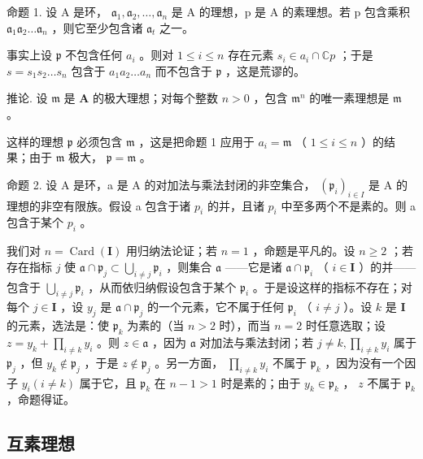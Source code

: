 命题 1. 设 A 是环， \(\mathfrak{a}_1, \mathfrak{a}_2, \ldots, \mathfrak{a}_n\) 是 A 的理想，p 是 A 的素理想。若 p 包含乘积 \(\mathfrak{a}_1\mathfrak{a}_2 \ldots \mathfrak{a}_n\) ，则它至少包含诸 \(\mathfrak{a}_t\) 之一。

事实上设 \(\mathfrak{p}\) 不包含任何 \(a_{i}\) 。则对 \(1 \leqslant i \leqslant n\) 存在元素 \(s_{i} \in a_{i} \cap \mathbb{C}p\) ；于是 \(s = s_{1}s_{2} \ldots s_{n}\) 包含于 \(a_{1}a_{2} \ldots a_{n}\) 而不包含于 \(\mathfrak{p}\) ，这是荒谬的。

推论. 设 \(\mathfrak{m}\) 是 \(\mathbf{A}\) 的极大理想；对每个整数 \(n > 0\) ，包含 \(\mathfrak{m}^n\) 的唯一素理想是 \(\mathfrak{m}\) 。

这样的理想 \(\mathfrak{p}\) 必须包含 \(\mathfrak{m}\) ，这是把命题 1 应用于 \(a_{i} = \mathfrak{m}\) （ \(1 \leqslant i \leqslant n\) ）的结果；由于 \(\mathfrak{m}\) 极大， \(\mathfrak{p} = \mathfrak{m}\) 。

命题 2. 设 A 是环，a 是 A 的对加法与乘法封闭的非空集合， \((\mathfrak{p}_{i})_{i\in I}\) 是 A 的理想的非空有限族。假设 a 包含于诸 \(p_{i}\) 的并，且诸 \(p_{i}\) 中至多两个不是素的。则 a 包含于某个 \(p_{i}\) 。

我们对 \(n = \operatorname{Card}(\mathbf{I})\) 用归纳法论证；若 \(n = 1\) ，命题是平凡的。设 \(n \geqslant 2\) ；若存在指标 \(j\) 使 \(\mathfrak{a} \cap \mathfrak{p}_j \subset \bigcup_{i \neq j} \mathfrak{p}_i\) ，则集合 \(\mathfrak{a}\) ——它是诸 \(\mathfrak{a} \cap \mathfrak{p}_i\) （ \(i \in \mathbf{I}\) ）的并——包含于 \(\bigcup_{i \neq j} \mathfrak{p}_i\) ，从而依归纳假设包含于某个 \(\mathfrak{p}_i\) 。于是设这样的指标不存在；对每个 \(j \in \mathbf{I}\) ，设 \(y_j\) 是 \(\mathfrak{a} \cap \mathfrak{p}_j\) 的一个元素，它不属于任何 \(\mathfrak{p}_i\) （ \(i \neq j\) ）。设 \(k\) 是 \(\mathbf{I}\) 的元素，选法是：使 \(\mathfrak{p}_k\) 为素的（当 \(n > 2\) 时），而当 \(n = 2\) 时任意选取；设 \(z = y_k + \prod_{i \neq k} y_i\) 。则 \(z \in \mathfrak{a}\) ，因为 \(\mathfrak{a}\) 对加法与乘法封闭；若 \(j \neq k, \prod_{i \neq k} y_i\) 属于 \(\mathfrak{p}_j\) ，但 \(y_k \notin \mathfrak{p}_j\) ，于是 \(z \notin \mathfrak{p}_j\) 。另一方面， \(\prod_{i \neq k} y_i\) 不属于 \(\mathfrak{p}_k\) ，因为没有一个因子 \(y_i (i \neq k)\) 属于它，且 \(\mathfrak{p}_k\) 在 \(n - 1 > 1\) 时是素的；由于 \(y_k \in \mathfrak{p}_k\) ， \(z\) 不属于 \(\mathfrak{p}_k\) ，命题得证。

\subsection{互素理想}

